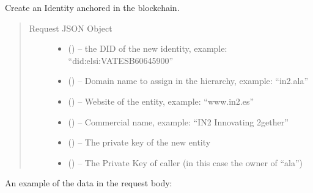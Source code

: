 \documentclass[letterpaper,10pt,english]{sphinxmanual}
\begin{document}
\begin{fulllineitems}
\label{\detokenize{privacycred:post--api-did-v1-identifiers}}
\sphinxAtStartPar
Create an Identity anchored in the blockchain.
\begin{quote}\begin{description}
\item[{Request JSON Object}] \leavevmode\begin{itemize}
\item {} 
\sphinxAtStartPar
{} () – the DID of the new identity, example: “did:elsi:VATES\sphinxhyphen{}B60645900”

\item {} 
\sphinxAtStartPar
{} () – Domain name to assign in the hierarchy, example: “in2.ala”

\item {} 
\sphinxAtStartPar
{} () – Website of the entity, example: “www.in2.es”

\item {} 
\sphinxAtStartPar
{} () – Commercial name, example: “IN2 Innovating 2gether”

\item {} 
\sphinxAtStartPar
{} () – The private key of the new entity

\item {} 
\sphinxAtStartPar
{} () – The Private Key of caller (in this case the owner of “ala”)

\end{itemize}

\end{description}\end{quote}

\sphinxAtStartPar
An example of the data in the request body:


\end{fulllineitems}
\end{document}
